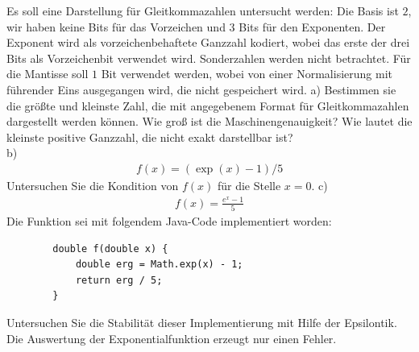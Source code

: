 \documentclass{scrartcl}
\begin{document}
	Es soll eine Darstellung für Gleitkommazahlen untersucht werden: Die Basis ist $2$, wir haben keine Bits für das Vorzeichen und $3$ Bits für den Exponenten. Der Exponent wird als vorzeichenbehaftete Ganzzahl kodiert, wobei das erste der drei Bits als Vorzeichenbit verwendet wird. Sonderzahlen werden nicht betrachtet. Für die Mantisse soll $1$ Bit verwendet werden, wobei von einer Normalisierung mit führender Eins ausgegangen wird, die nicht gespeichert wird.
	\n
	a) 
	Bestimmen sie die größte und kleinste Zahl, die mit angegebenem Format für Gleitkommazahlen dargestellt werden können. 
	\n
	Wie groß ist die Maschinengenauigkeit?
	\n 
	Wie lautet die kleinste positive Ganzzahl, die nicht exakt darstellbar ist?
	\lbreak 
	\\
	b) 
	\begin{align*}
		f(x) = (\exp(x) - 1 ) / 5
	\end{align*}
	Untersuchen Sie die Kondition von $f(x)$ für die Stelle $x=0$.
	\newpage 
	c)
	\begin{align*}
		f(x) = \frac{e^x - 1}{5}
	\end{align*}
	Die Funktion sei mit folgendem Java-Code implementiert worden:
	\begin{lstlisting}
		double f(double x) {
			double erg = Math.exp(x) - 1;
			return erg / 5;
		}
	\end{lstlisting}
	Untersuchen Sie die Stabilität dieser Implementierung mit Hilfe der Epsilontik.
	 Die Auswertung der Exponentialfunktion erzeugt nur einen Fehler.
\end{document}
